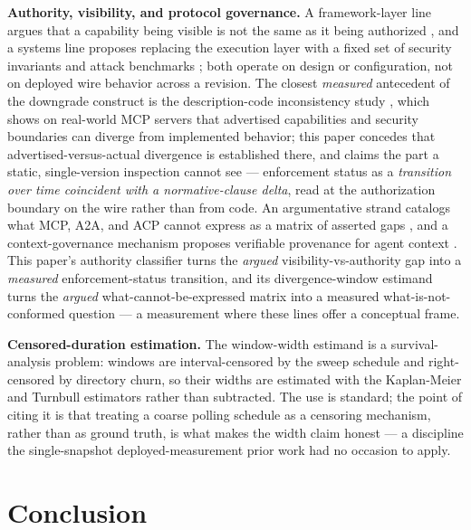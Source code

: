 \documentclass[11pt]{article}
\begin{document}
\textbf{Authority, visibility, and protocol governance.} A framework-layer line argues that a capability being visible is not the same as it being authorized \citep{capgates}, and a systems line proposes replacing the execution layer with a fixed set of security invariants and attack benchmarks \citep{hcp}; both operate on design or configuration, not on deployed wire behavior across a revision. The closest \emph{measured} antecedent of the downgrade construct is the description-code inconsistency study \citep{dci2026}, which shows on real-world MCP servers that advertised capabilities and security boundaries can diverge from implemented behavior; this paper concedes that advertised-versus-actual divergence is established there, and claims the part a static, single-version inspection cannot see --- enforcement status as a \emph{transition over time coincident with a normative-clause delta}, read at the authorization boundary on the wire rather than from code. An argumentative strand catalogs what MCP, A2A, and ACP cannot express as a matrix of asserted gaps \citep{govgaps}, and a context-governance mechanism proposes verifiable provenance for agent context \citep{contextnest}. This paper's authority classifier turns the \emph{argued} visibility-vs-authority gap into a \emph{measured} enforcement-status transition, and its divergence-window estimand turns the \emph{argued} what-cannot-be-expressed matrix into a measured what-is-not-conformed question --- a measurement where these lines offer a conceptual frame.

\textbf{Censored-duration estimation.} The window-width estimand is a survival-analysis problem: windows are interval-censored by the sweep schedule and right-censored by directory churn, so their widths are estimated with the Kaplan-Meier and Turnbull estimators \citep{kaplanmeier1958, turnbull1976} rather than subtracted. The use is standard; the point of citing it is that treating a coarse polling schedule as a censoring mechanism, rather than as ground truth, is what makes the width claim honest --- a discipline the single-snapshot deployed-measurement prior work had no occasion to apply.

\section{Conclusion}
\end{document}
